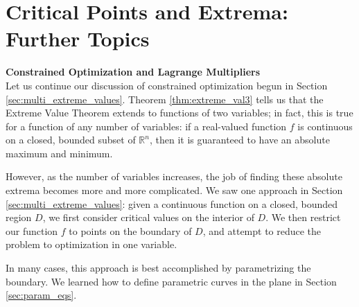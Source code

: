 \section{Critical Points and Extrema: Further Topics}\label{sec:multi_extreme_further}

\noindent\textbf{\large Constrained Optimization and Lagrange Multipliers}\\

Let us continue our discussion of constrained optimization begun in Section \ref{sec:multi_extreme_values}. Theorem \ref{thm:extreme_val3} tells us that the Extreme Value Theorem extends to functions of two variables; in fact, this is true for a function of any number of variables: if a real-valued function $f$ is continuous on a closed, bounded subset of $\mathbb{R}^n$, then it is guaranteed to have an absolute maximum and minimum.

However, as the number of variables increases, the job of finding these absolute extrema becomes more and more complicated. We saw one approach in Section \ref{sec:multi_extreme_values}: given a continuous function on a closed, bounded region $D$, we first consider critical values on the interior of $D$. We then restrict our function $f$ to points on the boundary of $D$, and attempt to reduce the problem to optimization in one variable.

In many cases, this approach is best accomplished by parametrizing the boundary. We learned how to define parametric curves in the plane in Section \ref{sec:param_eqs}.\\

